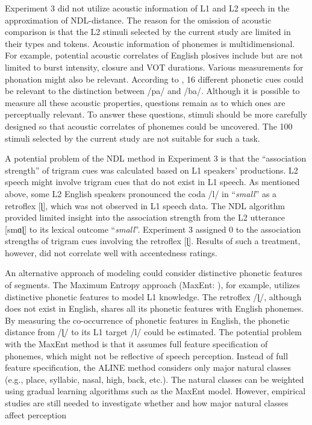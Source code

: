 Experiment 3 did not utilize acoustic information of L1 and L2 speech in the approximation of NDL-distance. The reason for the omission of acoustic comparison is that the L2 stimuli selected by the current study are limited in their types and tokens. Acoustic information of phonemes is multidimensional. For example, potential acoustic correlates of English plosives include but are not limited to burst intensity, closure and VOT durations. Various measurements for phonation might also be relevant. According to \citet{Lisker_1986}, 16 different phonetic cues could be relevant to the distinction between /pa/ and /ba/. Although it is possible to measure all these acoustic properties, questions remain as to which ones are perceptually relevant. To answer these questions, stimuli should be more carefully designed so that acoustic correlates of phonemes could be uncovered. The 100 stimuli selected by the current study are not suitable for such a task.

A potential problem of the NDL method in Experiment 3 is that the “association strength” of trigram cues was calculated based on L1 speakers’ productions. L2 speech might involve trigram cues that do not exist in L1 speech. As mentioned above, some L2 English speakers pronounced the coda /l/ in “\textit{small}” as a retroflex [ɭ], which was not observed in L1 speech data. The NDL algorithm provided limited insight into the association strength from the L2 utterance [smɑɭ] to its lexical outcome “\textit{small}”. Experiment 3 assigned 0 to the association strengths of trigram cues involving the retroflex [ɭ]. Results of such a treatment, however, did not correlate well with accentedness ratings.

An alternative approach of modeling could consider distinctive phonetic features of segments. The Maximum Entropy approach (MaxEnt: \citealp{Hayes_2008}), for example, utilizes distinctive phonetic features to model L1 knowledge. The retroflex /ɭ/, although does not exist in English, shares all its phonetic features with English phonemes. By measuring the co-occurrence of phonetic features in English, the phonetic distance from /ɭ/ to its L1 target /l/ could be estimated. The potential problem with the MaxEnt method is that it assumes full feature specification of phonemes, which might not be reflective of speech perception. Instead of full feature specification, the ALINE method \citep{Kondrak_2003} considers only major natural classes (e.g., place, syllabic, nasal, high, back, etc.). The natural classes can be weighted using gradual learning algorithms such as the MaxEnt model. However, empirical studies are still needed to investigate whether and how major natural classes affect perception 

